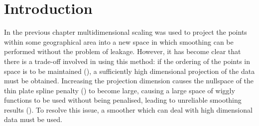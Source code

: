 \label{chap-gds}

\section{Introduction}
\label{gds-intro}

In the previous chapter multidimensional scaling was used to project the points within some geographical area into a new space in which smoothing can be performed without the problem of leakage. However, it has become clear that there is a trade-off involved in using this method: if the ordering of the points in space is to be maintained (), a sufficiently high dimensional projection of the data must be obtained. Increasing the projection dimension causes the nullspace of the thin plate spline penalty () to become large, causing a large space of wiggly functions to be used without being penalised, leading to unreliable smoothing results (). To resolve this issue, a smoother which can deal with high dimensional data must be used. 

